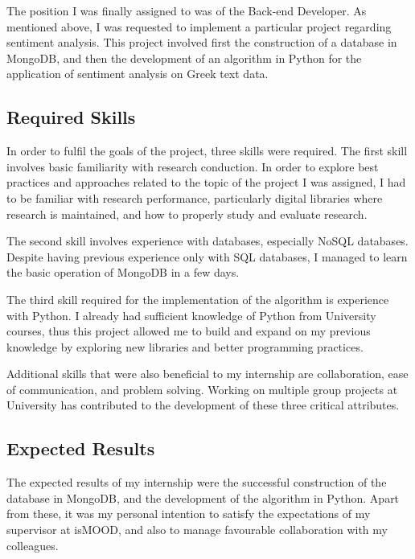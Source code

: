The position I was finally assigned to was of the Back-end Developer.
As mentioned above, I was requested
to implement a particular project regarding sentiment analysis.
This project involved first the construction 
of a database in MongoDB,
and then the development of an algorithm in Python
for the application of sentiment analysis on Greek text data.

\subsection{Required Skills}
\label{subsec:skills}

In order to fulfil the goals of the project,
three skills were required.
The first skill involves basic familiarity with research conduction.
In order to explore best practices and approaches
related to the topic of the project I was assigned,
I had to be familiar with research performance,
particularly digital libraries where research is maintained,
and how to properly study and evaluate research.

The second skill involves experience with databases,
especially NoSQL databases.
Despite having previous experience only with SQL databases,
I managed to learn the basic operation of MongoDB in a few days.

The third skill required for the implementation of the algorithm
is experience with Python.
I already had sufficient knowledge of Python
from University courses,
thus this project allowed me to build and expand on my previous knowledge
by exploring new libraries and better programming practices.

Additional skills that were also beneficial to my internship
are collaboration, ease of communication, and problem solving.
Working on multiple group projects at University
has contributed to the development of these three critical attributes.

\subsection{Expected Results}
\label{subsec:results}

The expected results of my internship were
the successful construction of the database in MongoDB,
and the development of the algorithm in Python.
Apart from these, it was my personal intention
to satisfy the expectations of my supervisor at isMOOD,
and also to manage favourable collaboration with my colleagues.

